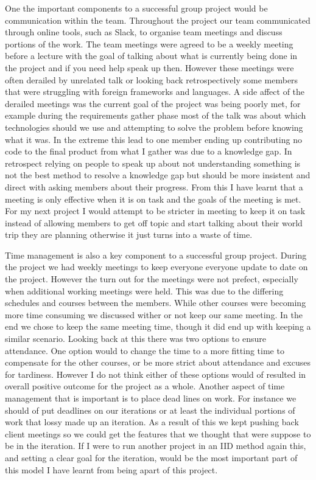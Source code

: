 \documentclass{style/CRPITStyle}
\begin{document}
One the important components to a successful group project would be communication within the team.
Throughout the project our team communicated through online tools, such as
Slack, to organise team meetings and discuss portions of the work. The team
meetings were agreed to be a weekly meeting before a lecture with the goal of
talking about what is currently being done in the project and if you need help
speak up then. However these meetings were often derailed by unrelated talk or
looking back retrospectively some members that were struggling with foreign
frameworks and languages.
A side affect of the derailed meetings was the current goal of the project was
being poorly met, for example during the requirements gather phase most of the
talk was about which technologies should we use and attempting to solve the
problem before knowing what it was.
In the extreme this lead to one member ending up
contributing no code to the final product from what I gather was due to a
knowledge gap. In retrospect relying on people to speak up about not understanding
something is not the best method to resolve a knowledge gap but should be more
insistent and direct with asking members about their progress.
From this I have learnt that a meeting is only effective when it is on task and
the goals of the meeting is met. For my next project I would attempt to be
stricter in meeting to keep it on task instead of allowing members to get off topic
and start talking about their world trip they are planning otherwise it just
turns into a waste of time.

\vspace{.1in}

Time management is also a key component to a successful group project.
During the project we had weekly meetings to keep everyone everyone update to
date on the project. However the turn out for the meetings were not prefect,
especially when additional working meetings were held. This was
due to the differing schedules and courses between the members. While other
courses were becoming more time consuming we discussed wither or not keep our
same meeting. In the end we chose to keep the same meeting time, though it did
end up with keeping a similar scenario. Looking back at this there was two
options to ensure attendance. One option would to change the time to a more
fitting time to compensate for the other courses, or be more strict about
attendance and excuses for tardiness. However I do not think either of these
options would of resulted in overall positive outcome for the project as a
whole. Another aspect of time management that is important is to place dead
lines on work. For instance we should of put deadlines on our iterations or at
least the individual portions of work that lossy made up an iteration. As a
result of this we kept pushing back client meetings so we could get the features
that we thought that were suppose to be in the iteration. If I were to run
another project in an IID method again this, and setting a clear goal for the
iteration, would be the most important part of this model I have learnt from
being apart of this project.
\end{document}
